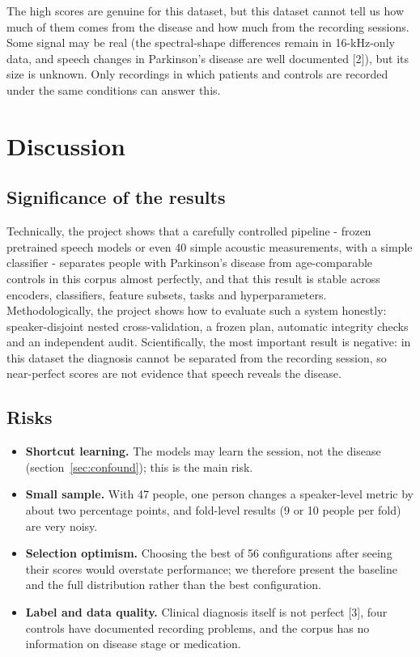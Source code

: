 \documentclass[11pt,a4paper]{article}
\begin{document}
\begin{tcolorbox}[colback=orange!5,colframe=orange!70!black,boxrule=0.5pt,arc=2pt,left=5pt,right=5pt,top=3pt,bottom=3pt,title={\small\bfseries Key point}]\small The high scores are genuine for this dataset, but this dataset cannot tell us how much of them comes from the disease and how much from the recording sessions. Some signal may be real (the spectral-shape differences remain in 16-kHz-only data, and speech changes in Parkinson's disease are well documented [2]), but its size is unknown. Only recordings in which patients and controls are recorded under the same conditions can answer this.\end{tcolorbox}
\section{Discussion}\label{sec:discussion}
\subsection{Significance of the results}
Technically, the project shows that a carefully controlled pipeline - frozen pretrained speech models or even 40 simple acoustic measurements, with a simple classifier - separates people with Parkinson's disease from age-comparable controls in this corpus almost perfectly, and that this result is stable across encoders, classifiers, feature subsets, tasks and hyperparameters. Methodologically, the project shows how to evaluate such a system honestly: speaker-disjoint nested cross-validation, a frozen plan, automatic integrity checks and an independent audit. Scientifically, the most important result is negative: in this dataset the diagnosis cannot be separated from the recording session, so near-perfect scores are not evidence that speech reveals the disease.

\subsection{Risks}
\begin{itemize}\item \textbf{Shortcut learning.} The models may learn the session, not the disease (section~\ref{sec:confound}); this is the main risk.
\item \textbf{Small sample.} With 47 people, one person changes a speaker-level metric by about two percentage points, and fold-level results (9 or 10 people per fold) are very noisy.
\item \textbf{Selection optimism.} Choosing the best of 56 configurations after seeing their scores would overstate performance; we therefore present the baseline and the full distribution rather than the best configuration.
\item \textbf{Label and data quality.} Clinical diagnosis itself is not perfect [3], four controls have documented recording problems, and the corpus has no information on disease stage or medication.
\end{itemize}
\end{document}

